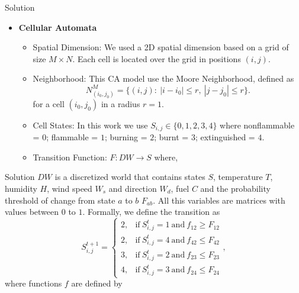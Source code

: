 \documentclass{beamer}
\begin{document}
      \begin{frame}{Solution}
        \begin{itemize}
          \item<1-> \textbf{Cellular Automata}
            \begin{itemize}
              \item<2-> Spatial Dimension: We used a 2D spatial dimension based on a grid of size $M\times N$.
                Each cell is located over the grid in positions $(i,j)$.
              \item<3-> Neighborhood: This CA model use the Moore Neighborhood, defined as
                \begin{equation}
                  N_{(i_0,j_0)}^M = \{(i,j): ~ |i-i_0|\leq r, ~ |j-j_0|\leq r \}.
                \end{equation}
                for a cell $(i_0, j_0)$ in a radius $r=1$.
              \item<4-> Cell States: In this work we use $S_{i,j}\in \{0, 1, 2, 3, 4\}$ where nonflammable = $0$; 
                flammable = $1$; burning = $2$; burnt = $3$; extinguished = $4$.
              \item<5-> Transition Function: $F: DW \rightarrow S$ where,
            \end{itemize}
        \end{itemize}
      \end{frame}
      
      \begin{frame}{Solution}
        $DW$ is a discretized world that contains states $S$, temperature $T$, humidity $H$, wind speed $W_s$ 
        and direction $W_d$, fuel $C$ and the probability threshold of change from state $a$ to $b$ $F_{ab}$. 
        All this variables are matrices with values between $0$ to $1$. Formally, we define the transition as
        \begin{equation}
          S_{i,j}^{t+1} =
          \begin{cases}
            2, & \text{if} ~ S_{i,j}^{t} = 1 ~ \text{and} ~ f_{12} \geq F_{12} \\
            2, & \text{if} ~ S_{i,j}^{t} = 4 ~ \text{and} ~ f_{42} \leq F_{42} \\
            3, & \text{if} ~ S_{i,j}^{t} = 2 ~ \text{and} ~ f_{23} \leq F_{23} \\
            4, & \text{if} ~ S_{i,j}^{t} = 3 ~ \text{and} ~ f_{24} \leq F_{24}
          \end{cases},
        \end{equation}
        where functions $f$ are defined by
      \end{frame}
      
\end{document}
